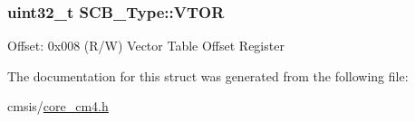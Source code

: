\subsubsection[{\texorpdfstring{V\+T\+OR}{VTOR}}]{ uint32\+\_\+t S\+C\+B\+\_\+\+Type\+::\+V\+T\+OR}\hypertarget{struct_s_c_b___type_a0faf96f964931cadfb71cfa54e051f6f}{}\label{struct_s_c_b___type_a0faf96f964931cadfb71cfa54e051f6f}
Offset\+: 0x008 (R/W) Vector Table Offset Register 

The documentation for this struct was generated from the following file\+:\begin{DoxyCompactItemize}
\item 
cmsis/\hyperlink{core__cm4_8h}{core\+\_\+cm4.\+h}\end{DoxyCompactItemize}
